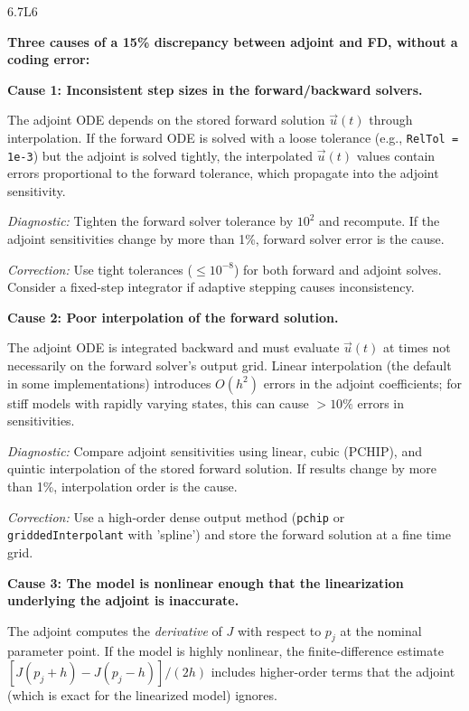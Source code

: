 \begin{solution}{6.7}{L6}

\solanswer

\textbf{Three causes of a 15\% discrepancy between adjoint and FD,
without a coding error:}

\textbf{Cause 1: Inconsistent step sizes in the forward/backward solvers.}

The adjoint ODE depends on the stored forward solution $\vec{u}(t)$
through interpolation. If the forward ODE is solved with a loose
tolerance (e.g., \texttt{RelTol = 1e-3}) but the adjoint is solved
tightly, the interpolated $\vec{u}(t)$ values contain errors proportional
to the forward tolerance, which propagate into the adjoint sensitivity.

\textit{Diagnostic:} Tighten the forward solver tolerance by $10^2$
and recompute. If the adjoint sensitivities change by more than 1\%,
forward solver error is the cause.

\textit{Correction:} Use tight tolerances ($\leq 10^{-8}$) for both
forward and adjoint solves. Consider a fixed-step integrator if
adaptive stepping causes inconsistency.

\textbf{Cause 2: Poor interpolation of the forward solution.}

The adjoint ODE is integrated backward and must evaluate $\vec{u}(t)$
at times not necessarily on the forward solver's output grid.
Linear interpolation (the default in some implementations) introduces
$O(h^2)$ errors in the adjoint coefficients; for stiff models with
rapidly varying states, this can cause $>10\%$ errors in sensitivities.

\textit{Diagnostic:} Compare adjoint sensitivities using linear,
cubic (PCHIP), and quintic interpolation of the stored forward solution.
If results change by more than 1\%, interpolation order is the cause.

\textit{Correction:} Use a high-order dense output method (\texttt{pchip}
or \texttt{griddedInterpolant} with 'spline') and store the forward
solution at a fine time grid.

\textbf{Cause 3: The model is nonlinear enough that the linearization
underlying the adjoint is inaccurate.}

The adjoint computes the \emph{derivative} of $J$ with respect to $p_j$
at the nominal parameter point. If the model is highly nonlinear,
the finite-difference estimate $[J(p_j+h) - J(p_j-h)]/(2h)$ includes
higher-order terms that the adjoint (which is exact for the linearized
model) ignores.


\end{solution}
